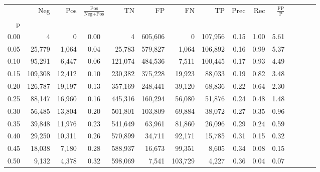 \begin{tabular}{rrrcrrrrrrrrrrr}
\toprule
{} &      Neg &     Pos & $\frac{\text{Pos}}{\text{Neg}+\text{Pos}}$ &       TN &       FP &       FN &       TP &  Prec &   Rec & $\frac{\text{FP}}{\text{P}}$ \\
p    &          &         &                                            &          &          &          &          &       &       &                              \\
\midrule
0.00 &        4 &       0 &                                       0.00 &        4 &  605,606 &        0 &  107,956 &  0.15 &  1.00 &                         5.61 \\
0.05 &   25,779 &   1,064 &                                       0.04 &   25,783 &  579,827 &    1,064 &  106,892 &  0.16 &  0.99 &                         5.37 \\
0.10 &   95,291 &   6,447 &                                       0.06 &  121,074 &  484,536 &    7,511 &  100,445 &  0.17 &  0.93 &                         4.49 \\
0.15 &  109,308 &  12,412 &                                       0.10 &  230,382 &  375,228 &   19,923 &   88,033 &  0.19 &  0.82 &                         3.48 \\
0.20 &  126,787 &  19,197 &                                       0.13 &  357,169 &  248,441 &   39,120 &   68,836 &  0.22 &  0.64 &                         2.30 \\
0.25 &   88,147 &  16,960 &                                       0.16 &  445,316 &  160,294 &   56,080 &   51,876 &  0.24 &  0.48 &                         1.48 \\
0.30 &   56,485 &  13,804 &                                       0.20 &  501,801 &  103,809 &   69,884 &   38,072 &  0.27 &  0.35 &                         0.96 \\
0.35 &   39,848 &  11,976 &                                       0.23 &  541,649 &   63,961 &   81,860 &   26,096 &  0.29 &  0.24 &                         0.59 \\
0.40 &   29,250 &  10,311 &                                       0.26 &  570,899 &   34,711 &   92,171 &   15,785 &  0.31 &  0.15 &                         0.32 \\
0.45 &   18,038 &   7,180 &                                       0.28 &  588,937 &   16,673 &   99,351 &    8,605 &  0.34 &  0.08 &                         0.15 \\
0.50 &    9,132 &   4,378 &                                       0.32 &  598,069 &    7,541 &  103,729 &    4,227 &  0.36 &  0.04 &                         0.07 \\

\end{tabular}
